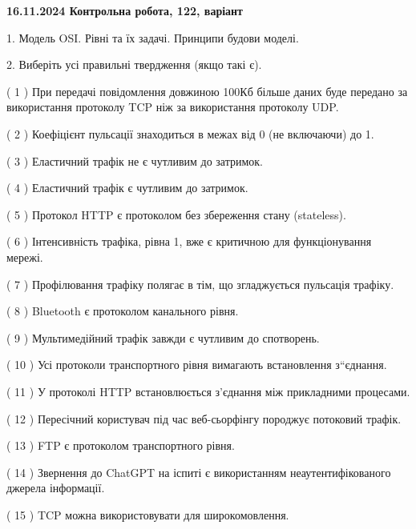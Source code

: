\documentclass[12pt, ukrainian]{article}
\begin{document}
\vspace{4mm}
\newpage
\begin {large}

\textbf{16.11.2024 Контрольна робота, 122, варіант  }\par


{
1. Модель OSI. Рівні та їх задачі. Принципи будови моделі.



\vspace{5mm}
2. Виберіть усі правильні твердження (якщо такі є).\par
\vspace{2mm}

( 1 ) При передачі повідомлення довжиною 100Кб більше даних буде передано за використання протоколу TCP ніж за використання протоколу UDP.

( 2 ) Коефіцієнт пульсації знаходиться в межах від 0 (не включаючи) до 1.

( 3 ) Еластичний трафік не є чутливим до затримок.

( 4 ) Еластичний трафік є чутливим до затримок.

( 5 ) Протокол  HTTP є протоколом без збереження стану (stateless).

( 6 ) Інтенсивність трафіка, рівна 1, вже є критичною для функціонування мережі.

( 7 ) Профілювання трафіку полягає в тім, що згладжується пульсація трафіку.

( 8 ) Bluetooth є протоколом канального рівня.

( 9 ) Мультимедійний трафік завжди є чутливим до спотворень.

( 10 ) Усі протоколи транспортного рівня вимагають встановлення з“єднання.

( 11 ) У протоколі HTTP встановлюється з'єднання між прикладними процесами.

( 12 ) Пересічний користувач під час веб-сьорфінгу породжує потоковий трафік.

( 13 ) FTP є протоколом транспортного рівня.

( 14 ) Звернення до ChatGPT на іспиті є використанням неаутентифікованого джерела інформації.

( 15 ) TCP можна використовувати для широкомовлення.
}
\end {large}
\end{document}
